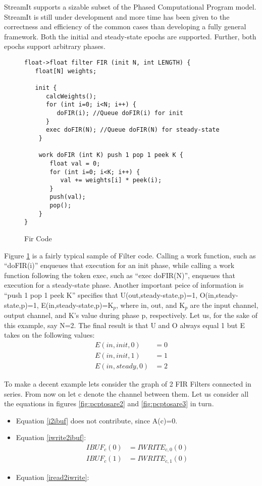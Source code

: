 StreamIt supports a sizable subset of the Phased Computational Program model. StreamIt is still under development and more time has been given to the correctness and efficiency of the common cases than developing a fully general framework. Both the initial and steady-state epochs are supported. Further, both epochs support arbitrary phases.
\begin{figure}[t]
\begin{verbatim}
float->float filter FIR (init N, int LENGTH) {
   float[N] weights;

   init {
      calcWeights();
      for (int i=0; i<N; i++) {
         doFIR(i); //Queue doFIR(i) for init
      }
      exec doFIR(N); //Queue doFIR(N) for steady-state
    }

    work doFIR (int K) push 1 pop 1 peek K {
       float val = 0;
       for (int i=0; i<K; i++) {
          val += weights[i] * peek(i);
       }
       push(val);
       pop();
    }
}
\end{verbatim}
\caption{Fir Code
\protect\label{fig:fir}}
\end{figure}

Figure \ref{fig:fir} is a fairly typical sample of Filter code. Calling a work function, such as ``doFIR(i)'' enqueues that execution for an init phase, while calling a work function following the token exec, such as ``exec doFIR(N)'', enqueues that execution for a steady-state phase. Another important peice of information is ``push 1 pop 1 peek K'' specifies that U(out,steady-state,p)=1, O(in,steady-state,p)=1, E(in,steady-state,p)=K$_p$, where in, out, and K$_p$ are the input channel, output channel, and K's value during phase p, respectively. Let us, for the sake of this example, say N=2. The final result is that U and O always equal 1 but E takes on the following values:
\begin{align}
E(in,init,0)&=0\nonumber\\
E(in,init,1)&=1\nonumber\\
E(in,steady,0)&=2\nonumber
\end{align}

To make a decent example lets consider the graph of 2 FIR Filters connected in series. From now on let c denote the channel between them. Let us consider all the equations in figures \ref{fig:pcptosare2} and \ref{fig:pcptosare3} in turn.
\begin{itemize}
\item Equation \ref{i2ibuf} does not contribute, since A(c)=0.
\item Equation \ref{iwrite2ibuf}:
\begin{align}
IBUF_c(0)&=IWRITE_{c,0}(0)\nonumber\\
IBUF_c(1)&=IWRITE_{c,1}(0)\nonumber
\end{align}
\item Equation \ref{iread2iwrite}:

\end{itemize}